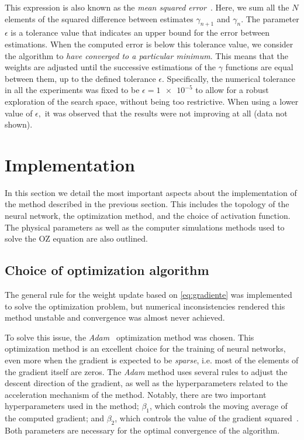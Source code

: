 This expression is also known as the \emph{mean squared error}~\cite{goodfellowDeepLearning2016}.
Here, we sum all the $N$ elements of the squared difference between estimates $\gamma_{n+1}$
and $\gamma_{n}$. The parameter $\epsilon$ is a tolerance value that indicates an 
upper bound for the error between estimations. When the computed error is below this 
tolerance value, we consider the algorithm to \emph{have converged to a particular minimum}.
This means that the weights are adjusted until the successive estimations of the $\gamma$
functions are equal between them, up to the defined tolerance $\epsilon$.
Specifically, the numerical tolerance in all the experiments was fixed to be
$\epsilon = \num{1e-5}$ to allow for a robust exploration of the search space, without being
too restrictive. When using a lower value of $\epsilon,$ it was observed that the results 
were not improving at all (data not shown).

\section{Implementation}
In this section we detail the most important aspects about the implementation of the
method described in the previous section. This includes the topology of the neural network,
the optimization method, and the choice of activation function. The physical parameters
as well as the computer simulations methods used to solve the OZ equation are also outlined.

\subsection{Choice of optimization algorithm}
The general rule for the weight update based on \autoref{eq:gradiente} was
implemented to solve the optimization problem, but numerical inconsistencies rendered this 
method unstable and convergence was almost never achieved.

To solve this issue, the \emph{Adam}~\cite{kingmaAdamMethodStochastic2017} optimization 
method was chosen. This optimization method is an excellent choice for the training
of neural networks, even more when the gradient is expected to be \emph{sparse}, i.e.
most of the elements of the gradient itself are zeros.
The \emph{Adam} method uses several rules to adjust the descent direction of the gradient,
as well as the hyperparameters related to the acceleration mechanism of the method.
Notably, there are two important hyperparameters used in the method; $\beta_1$,
which controls the moving average of the computed gradient; and $\beta_2$, which controls
the value of the gradient squared~\cite{kingmaAdamMethodStochastic2017}. Both parameters 
are necessary for the optimal convergence of the algorithm.

